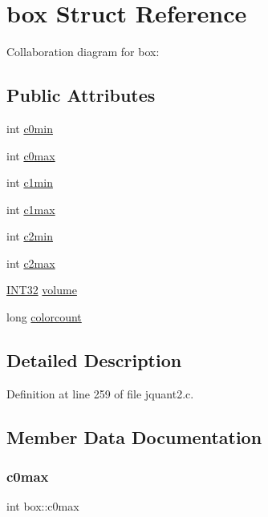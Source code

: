\hypertarget{structbox}{}\section{box Struct Reference}
\label{structbox}


Collaboration diagram for box\+:
\subsection*{Public Attributes}
\begin{DoxyCompactItemize}
\item 
int \mbox{\hyperlink{structbox_acf78968f99d9730f516003fc77a60f07}{c0min}}
\item 
int \mbox{\hyperlink{structbox_a9a9cb397dbffdd1b17cc670834e3fb4d}{c0max}}
\item 
int \mbox{\hyperlink{structbox_a81563b63e4a79ca40bdfeacf5070a6d9}{c1min}}
\item 
int \mbox{\hyperlink{structbox_a5313694dbee838c7f4d5f409e954460e}{c1max}}
\item 
int \mbox{\hyperlink{structbox_a781a101c49c5e4a789967569994d924d}{c2min}}
\item 
int \mbox{\hyperlink{structbox_a1fe5b5ab81ed7e8e3f104deb168576cd}{c2max}}
\item 
\mbox{\hyperlink{jmorecfg_8h_a0cb58e7e6f0bad369840a52e54a56ae0}{I\+N\+T32}} \mbox{\hyperlink{structbox_acaba83fb8356e20d21793c23c41033a1}{volume}}
\item 
long \mbox{\hyperlink{structbox_af92a3080724bf452855f631e901b803c}{colorcount}}
\end{DoxyCompactItemize}


\subsection{Detailed Description}


Definition at line 259 of file jquant2.\+c.



\subsection{Member Data Documentation}
\mbox{\label{structbox_a9a9cb397dbffdd1b17cc670834e3fb4d}} 
\subsubsection{\texorpdfstring{c0max}{c0max}}
{\footnotesize\ttfamily int box\+::c0max}



